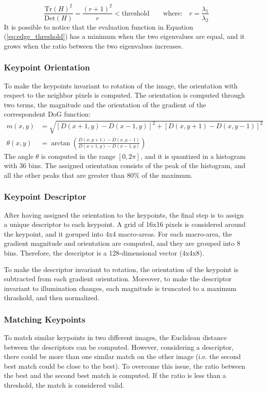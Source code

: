 \begin{equation}
    \frac{\text{Tr}(H)^2}{\text{Det}(H)} = \frac{(r+1)^2}{r} < \text{threshold}
    \qquad
    \text{where:} \quad r = \frac{\lambda_1}{\lambda_2}
    \label{eq:edge_threshold}
\end{equation}
It is possible to notice that the evaluation function in Equation 
(\ref{eq:edge_threshold}) has a minimum when the two eigenvalues are equal, 
and it grows when the ratio between the two eigenvalues increases.

\subsubsection*{Keypoint Orientation}
To make the keypoints invariant to rotation of the image, the orientation with 
respect to the neighbor pixels is computed. The orientation is computed through 
two terms, the magnitude and the orientation of the gradient of the 
correspondent DoG function:
\begin{align*}
    m(x, y) &= \sqrt{\left[D(x+1, y) - D(x-1, y)\right]^2 + \left[D(x, y+1) - D(x, y-1)\right]^2} \\
    \theta(x, y) &= \arctan\left(\frac{D(x, y+1) - D(x, y-1)}{D(x+1, y) - D(x-1, y)}\right)
\end{align*}
The angle $\theta$ is computed in the range $[0, 2\pi]$, and it is quantized 
in a histogram with 36 bins. The assigned orientation consists of the peak of 
the histogram, and all the other peaks that are greater than 80\% of the maximum.

\subsubsection*{Keypoint Descriptor}
After having assigned the orientation to the keypoints, the final step is to 
assign a unique descriptor to each keypoint. 
A grid of 16x16 pixels is considered around the keypoint, and it goruped into 
4x4 macro-areas. For each macro-area, the gradient magnitude and orientation 
are computed, and they are grouped into 8 bins. Therefore, the descriptor is 
a 128-dimensional vector (4x4x8).

To make the descriptor invariant to rotation, the orientation of the keypoint 
is subtracted from each gradient orientation.
Moreover, to make the descriptor invariant to illumination changes, each 
magnitude is truncated to a maximum thrashold, and then normalized.

\subsubsection*{Matching Keypoints}
To match similar keypoints in two different images, the Euclidean distance 
between the descriptors can be computed. However, considering a descriptor, 
there could be more than one similar match on the other image (i.e. the second 
best match could be close to the best). To overcome this issue, the ratio between 
the best and the second best match is computed. If the ratio is less than a 
threshold, the match is considered valid.

